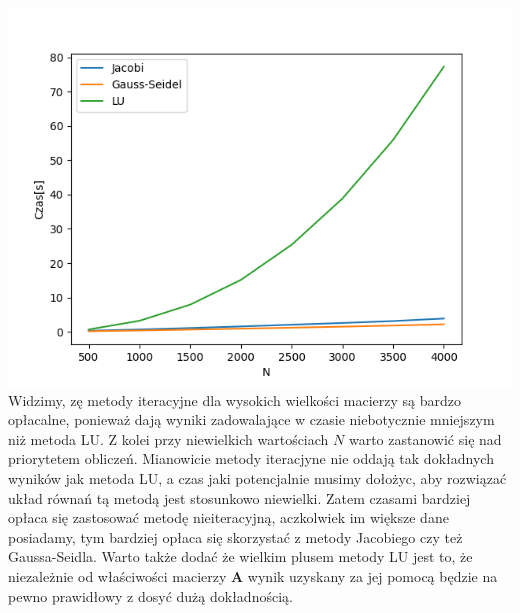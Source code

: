 \documentclass[12pt]{article}
\begin{document}
\includegraphics[scale=0.8]{zadanieE_3}\\
Widzimy, zę metody iteracyjne dla wysokich wielkości macierzy są bardzo opłacalne, ponieważ dają wyniki zadowalające w czasie niebotycznie mniejszym niż metoda LU. Z kolei przy niewielkich wartościach $N$ warto zastanowić się nad priorytetem obliczeń. Mianowicie metody iteracjyne nie oddają tak dokładnych wyników jak metoda LU, a czas jaki potencjalnie musimy dołożyc, aby rozwiązać układ równań tą metodą jest stosunkowo niewielki. Zatem czasami bardziej opłaca się zastosować metodę nieiteracyjną, aczkolwiek im większe dane posiadamy, tym bardziej opłaca się skorzystać z metody Jacobiego czy też Gaussa-Seidla. Warto także dodać że wielkim plusem metody LU jest to, że niezależnie od właściwości macierzy \textbf{A} wynik uzyskany za jej pomocą będzie na pewno prawidłowy z dosyć dużą dokładnością.\\
\end{document}

